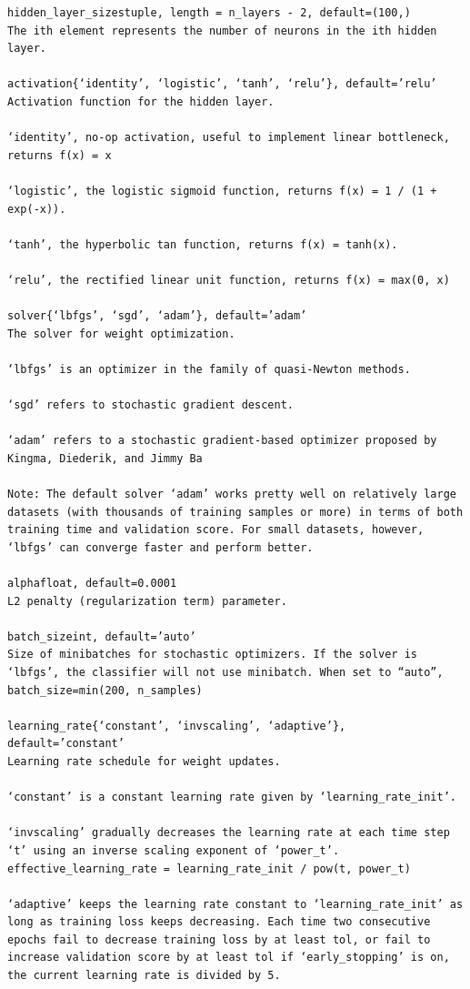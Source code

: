 \documentclass[12pt]{article}
\begin{document}
\begin{verbatim}
hidden_layer_sizestuple, length = n_layers - 2, default=(100,)
The ith element represents the number of neurons in the ith hidden layer.

activation{‘identity’, ‘logistic’, ‘tanh’, ‘relu’}, default=’relu’
Activation function for the hidden layer.

‘identity’, no-op activation, useful to implement linear bottleneck, returns f(x) = x

‘logistic’, the logistic sigmoid function, returns f(x) = 1 / (1 + exp(-x)).

‘tanh’, the hyperbolic tan function, returns f(x) = tanh(x).

‘relu’, the rectified linear unit function, returns f(x) = max(0, x)

solver{‘lbfgs’, ‘sgd’, ‘adam’}, default=’adam’
The solver for weight optimization.

‘lbfgs’ is an optimizer in the family of quasi-Newton methods.

‘sgd’ refers to stochastic gradient descent.

‘adam’ refers to a stochastic gradient-based optimizer proposed by Kingma, Diederik, and Jimmy Ba

Note: The default solver ‘adam’ works pretty well on relatively large datasets (with thousands of training samples or more) in terms of both training time and validation score. For small datasets, however, ‘lbfgs’ can converge faster and perform better.

alphafloat, default=0.0001
L2 penalty (regularization term) parameter.

batch_sizeint, default=’auto’
Size of minibatches for stochastic optimizers. If the solver is ‘lbfgs’, the classifier will not use minibatch. When set to “auto”, batch_size=min(200, n_samples)

learning_rate{‘constant’, ‘invscaling’, ‘adaptive’}, default=’constant’
Learning rate schedule for weight updates.

‘constant’ is a constant learning rate given by ‘learning_rate_init’.

‘invscaling’ gradually decreases the learning rate at each time step ‘t’ using an inverse scaling exponent of ‘power_t’. effective_learning_rate = learning_rate_init / pow(t, power_t)

‘adaptive’ keeps the learning rate constant to ‘learning_rate_init’ as long as training loss keeps decreasing. Each time two consecutive epochs fail to decrease training loss by at least tol, or fail to increase validation score by at least tol if ‘early_stopping’ is on, the current learning rate is divided by 5.


\end{verbatim}
\end{document}
